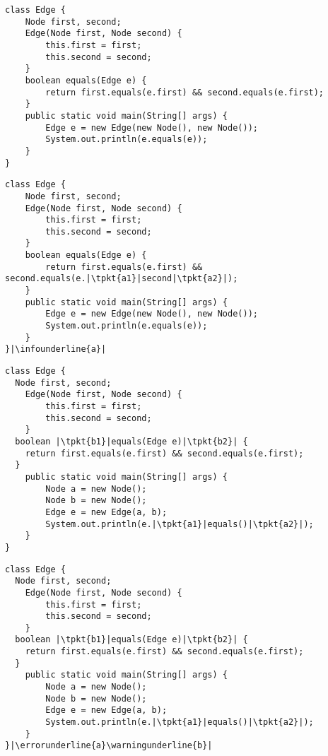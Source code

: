\newsavebox{\edgelogicalerror}
\begin{lrbox}{\edgelogicalerror}
	\begin{lstlisting}
class Edge {
	Node first, second;
	Edge(Node first, Node second) {
		this.first = first;
		this.second = second;
	}
	boolean equals(Edge e) {
		return first.equals(e.first) && second.equals(e.first);
	}
	public static void main(String[] args) {
		Edge e = new Edge(new Node(), new Node());
		System.out.println(e.equals(e));
	}
}
	\end{lstlisting}
\end{lrbox}

\newsavebox{\edgelogicalerrorfix}
\begin{lrbox}{\edgelogicalerrorfix}
	\begin{lstlisting}
class Edge {
	Node first, second;
	Edge(Node first, Node second) {
		this.first = first;
		this.second = second;
	}
	boolean equals(Edge e) {
		return first.equals(e.first) && second.equals(e.|\tpkt{a1}|second|\tpkt{a2}|);
	}
	public static void main(String[] args) {
		Edge e = new Edge(new Node(), new Node());
		System.out.println(e.equals(e));
	}
}|\infounderline{a}|
	\end{lstlisting}
\end{lrbox}

\newsavebox{\codeone}
\begin{lrbox}{\codeone}
\begin{lstlisting}
class Edge {
  Node first, second;
	Edge(Node first, Node second) {
		this.first = first;
		this.second = second;
	}
  boolean |\tpkt{b1}|equals(Edge e)|\tpkt{b2}| {
    return first.equals(e.first) && second.equals(e.first);
  }
	public static void main(String[] args) {
		Node a = new Node();
		Node b = new Node();
		Edge e = new Edge(a, b);
		System.out.println(e.|\tpkt{a1}|equals()|\tpkt{a2}|);
	}
}
\end{lstlisting}
\end{lrbox}

\newsavebox{\bugone}
\begin{lrbox}{\bugone}
\begin{lstlisting}
class Edge {
  Node first, second;
	Edge(Node first, Node second) {
		this.first = first;
		this.second = second;
	}
  boolean |\tpkt{b1}|equals(Edge e)|\tpkt{b2}| {
    return first.equals(e.first) && second.equals(e.first);
  }
	public static void main(String[] args) {
		Node a = new Node();
		Node b = new Node();
		Edge e = new Edge(a, b);
		System.out.println(e.|\tpkt{a1}|equals()|\tpkt{a2}|);
	}
}|\errorunderline{a}\warningunderline{b}|
\end{lstlisting}
\end{lrbox}

